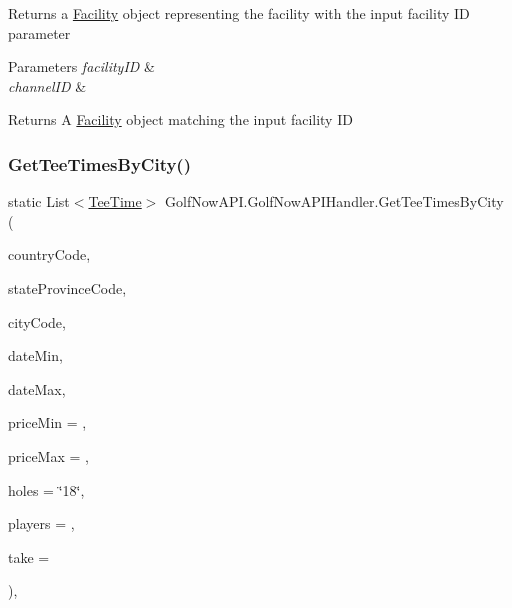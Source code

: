 Returns a \mbox{\hyperlink{class_golf_now_a_p_i_1_1_facility}{Facility}} object representing the facility with the input facility ID parameter 


\begin{DoxyParams}{Parameters}
{\em facility\+ID} & \\
\hline
{\em channel\+ID} & \\
\hline
\end{DoxyParams}
\begin{DoxyReturn}{Returns}
A \mbox{\hyperlink{class_golf_now_a_p_i_1_1_facility}{Facility}} object matching the input facility ID
\end{DoxyReturn}
\mbox{\label{class_golf_now_a_p_i_1_1_golf_now_a_p_i_handler_a99d2a8b9ee4da0a3bd0bcf4274b8ee53}} 
\subsubsection{\texorpdfstring{GetTeeTimesByCity()}{GetTeeTimesByCity()}}
{\footnotesize\ttfamily static List$<$\mbox{\hyperlink{class_golf_now_a_p_i_1_1_tee_time}{Tee\+Time}}$>$ Golf\+Now\+A\+P\+I.\+Golf\+Now\+A\+P\+I\+Handler.\+Get\+Tee\+Times\+By\+City (\begin{DoxyParamCaption}\item[{string}]{country\+Code,  }\item[{string}]{state\+Province\+Code,  }\item[{string}]{city\+Code,  }\item[{Date\+Time}]{date\+Min,  }\item[{Date\+Time}]{date\+Max,  }\item[{float}]{price\+Min = {},  }\item[{float}]{price\+Max = {},  }\item[{string}]{holes = {\ttfamily \char`\"{}18\char`\"{}},  }\item[{int}]{players = {},  }\item[{int}]{take = {} }\end{DoxyParamCaption})\hspace{0.3cm}{\ttfamily [inline]}, {\ttfamily [static]}}



